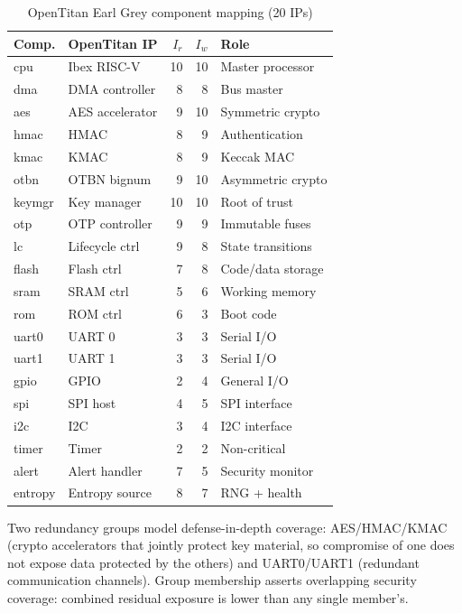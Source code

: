 \documentclass[conference]{IEEEtran}
\begin{document}
\begin{table}[t]
\caption{OpenTitan Earl Grey component mapping (20 IPs)}
\label{tab:otmap}
\centering
\scriptsize
\setlength{\tabcolsep}{2.5pt}
\begin{tabular}{llrrl}
\toprule
Comp. & OpenTitan IP & $I_r$ & $I_w$ & Role \\
\midrule
cpu    & Ibex RISC-V     & 10 & 10 & Master processor \\
dma    & DMA controller  &  8 &  8 & Bus master \\
aes    & AES accelerator &  9 & 10 & Symmetric crypto \\
hmac   & HMAC            &  8 &  9 & Authentication \\
kmac   & KMAC            &  8 &  9 & Keccak MAC \\
otbn   & OTBN bignum     &  9 & 10 & Asymmetric crypto \\
keymgr & Key manager     & 10 & 10 & Root of trust \\
otp    & OTP controller  &  9 &  9 & Immutable fuses \\
lc     & Lifecycle ctrl  &  9 &  8 & State transitions \\
flash  & Flash ctrl      &  7 &  8 & Code/data storage \\
sram   & SRAM ctrl       &  5 &  6 & Working memory \\
rom    & ROM ctrl        &  6 &  3 & Boot code \\
uart0  & UART 0          &  3 &  3 & Serial I/O \\
uart1  & UART 1          &  3 &  3 & Serial I/O \\
gpio   & GPIO            &  2 &  4 & General I/O \\
spi    & SPI host        &  4 &  5 & SPI interface \\
i2c    & I2C             &  3 &  4 & I2C interface \\
timer  & Timer           &  2 &  2 & Non-critical \\
alert  & Alert handler   &  7 &  5 & Security monitor \\
entropy& Entropy source  &  8 &  7 & RNG + health \\
\bottomrule
\end{tabular}
\end{table}

Two redundancy groups model defense-in-depth coverage:
AES/HMAC/KMAC (crypto accelerators that jointly protect
key material, so compromise of one does not expose data protected by
the others) and UART0/UART1 (redundant communication channels).
Group membership asserts overlapping security coverage: combined residual
exposure is lower than any single member's.
\end{document}
